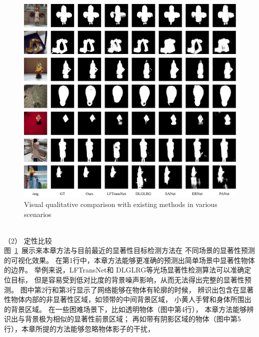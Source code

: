 %
%
\begin{figure}[!ht]
	\centering
	\includegraphics[width=\linewidth]{figures/chapter4/figures_comp}
	{Visual qualitative comparison with existing methods in various scenarios}
	\label{chpt4:fig:comparison_4}
\end{figure}
\\
%
%
%
%
\indent
（2）
定性比较\\
%
%
%
%
\indent
图~\ref{chpt4:fig:comparison_4}~展示来本章方法与目前最近的显著性目标检测方法在
不同场景的显著性预测的可视化效果。
在第1行中，本章方法能够更准确的预测出简单场景中显著性物体的边界。
举例来说，LFTransNet和
DLGLRG等光场显著性检测算法可以准确定位目标，
但是容易受到低对比度的背景噪声影响，从而无法得出完整的显著性预测。
图中第2行和第3行显示了网络能够在物体有轮廓的时候，
辨识出包含在显著性物体内部的非显著性区域，如领带的中间背景区域，
小黄人手臂和身体所围出的背景区域。
在一些困难场景下，比如透明物体（图中第4行），
本章方法能够辨识出与背景极为相似的显著性前景区域；
再如带有阴影区域的物体（图中第5行），本章所提的方法能够忽略物体影子的干扰，
